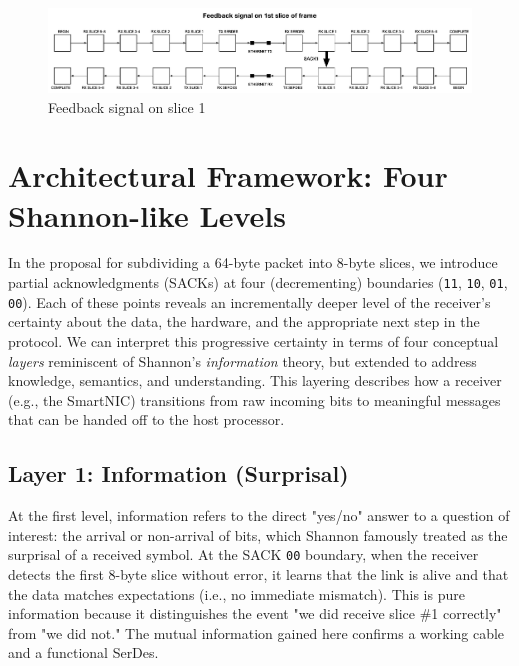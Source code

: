 \documentclass[../../../OAE-SPEC-MAIN.tex]{subfiles}
\begin{document}

\begin{figure}
\includegraphics[width=\textwidth]{FIGURES/Feedback-slice-1.pdf}
  \caption{Feedback signal on slice 1}
\end{figure}

\vspace{30px}

\section{Architectural Framework: Four Shannon-like Levels}

In the proposal for subdividing a 64-byte packet into 8-byte slices, we introduce partial acknowledgments (SACKs) at four (decrementing) boundaries (\texttt{11}, \texttt{10}, \texttt{01}, \texttt{00}). Each of these points reveals an incrementally deeper level of the receiver’s certainty about the data, the hardware, and the appropriate next step in the protocol. We can interpret this progressive certainty in terms of four conceptual \emph{layers} reminiscent of Shannon’s \emph{information} theory, but extended to address knowledge, semantics, and understanding. This layering describes how a receiver (e.g., the SmartNIC) transitions from raw incoming bits to meaningful messages that can be handed off to the host processor.


\subsection{Layer 1: Information (Surprisal)}

At the first level, information refers to the direct "yes/no" answer to a question of interest: the arrival or non-arrival of bits, which Shannon famously treated as the surprisal of a received symbol. At the SACK \texttt{00} boundary, when the receiver detects the first 8-byte slice without error, it learns that the link is alive and that the data matches expectations (i.e., no immediate mismatch). This is pure information because it distinguishes the event "we did receive slice \#1 correctly" from "we did not." The mutual information gained here confirms a working cable and a functional SerDes.
\end{document}
